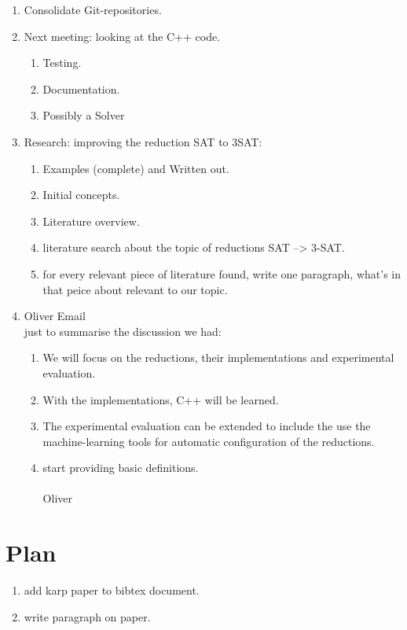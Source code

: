 \documentclass[a4paper]{report}
\begin{document}
\begin{enumerate}
\item Consolidate Git-repositories.
\item Next meeting: looking at the C++ code.
  \begin{enumerate}
  \item Testing.
  \item Documentation.
  \item Possibly a Solver
  \end{enumerate}
\item Research: improving the reduction SAT to 3SAT:
  \begin{enumerate}
  \item Examples (complete) and Written out.
  \item Initial concepts.
  \item Literature overview.
  \item literature search about the topic of reductions SAT --> 3-SAT.
  \item for every relevant piece of literature found, write one paragraph, what's in that peice about relevant to our topic.
  \end{enumerate}
\item Oliver Email\\
 just to summarise the discussion we had:
  \begin{enumerate}
     \item We will focus on the reductions, their implementations and experimental evaluation.
    \item With the implementations, C++ will be learned.
    \item The experimental evaluation can be extended to include the use the machine-learning tools for automatic configuration of the reductions.
    \item start providing basic definitions. \\ 
\\ Oliver
  \end{enumerate}
\end{enumerate}

\section{Plan}
\label{sec:Plan}
\begin{enumerate}
\item add karp paper to bibtex document.\cite{Karp1972NP}
\item write paragraph on paper.

\end{enumerate}
\end{document}
